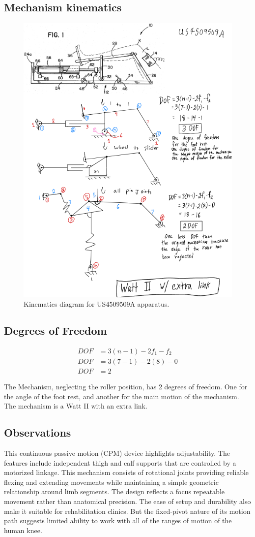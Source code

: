 \documentclass[11pt]{article}
\begin{document}
\subsection{Mechanism kinematics}
\begin{figure}[H]
  \centering
  \includegraphics[width=0.54\linewidth]{../Kinematic Mechanism Images/4509509.png}
  \caption{Kinematics diagram for US4509509A apparatus.}
  \label{fig:US4509509A_kinematics}
\end{figure}

\subsection{Degrees of Freedom}
\[
\begin{aligned}
DOF &= 3(n-1) - 2f_1 - f_2 \\
DOF &= 3(7-1) - 2(8) - 0 \\
DOF &= 2
\end{aligned}
\]

The Mechanism, neglecting the roller position, has 2 degrees of freedom. One for the angle of the foot rest, and another for the main motion of the mechanism. The mechanism is a Watt II with an extra link.

\subsection{Observations}
This continuous passive motion (CPM) device highlights adjustability. The features include independent thigh and calf supports that are controlled by a motorized linkage. This mechanism consists of rotational joints providing reliable flexing and extending movements while maintaining a simple geometric relationship around limb segments. The design reflects a focus repeatable movement rather than anatomical precision. The ease of setup and durability also make it suitable for rehabilitation clinics. But the fixed-pivot nature of its motion path suggests limited ability to work with all of the ranges of motion of the human knee.
\end{document}
